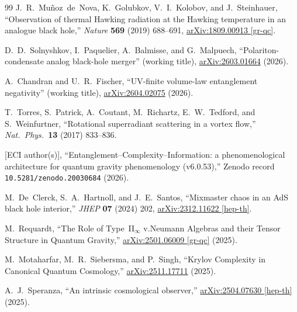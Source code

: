 \documentclass[12pt,a4paper]{article}
\begin{document}
\begin{thebibliography}{99}
J.~R.~Mu\~{n}oz~de~Nova, K.~Golubkov, V.~I.~Kolobov, and J.~Steinhauer,
``Observation of thermal Hawking radiation at the Hawking temperature in
an analogue black hole,''
\textit{Nature} \textbf{569} (2019) 688--691,
\href{https://arxiv.org/abs/1809.00913}{arXiv:1809.00913 [gr-qc]}.

D.~D.~Solnyshkov, I.~Paquelier, A.~Balmisse, and G.~Malpuech,
``Polariton-condensate analog black-hole merger'' (working title),
\href{https://arxiv.org/abs/2603.01664}{arXiv:2603.01664}
(2026).

A.~Chandran and U.~R.~Fischer,
``UV-finite volume-law entanglement negativity'' (working title),
\href{https://arxiv.org/abs/2604.02075}{arXiv:2604.02075}
(2026).

T.~Torres, S.~Patrick, A.~Coutant, M.~Richartz, E.~W.~Tedford, and S.~Weinfurtner,
``Rotational superradiant scattering in a vortex flow,''
\textit{Nat.\ Phys.}\ \textbf{13} (2017) 833--836.

[ECI author(s)],
``Entanglement--Complexity--Information: a phenomenological architecture
for quantum gravity phenomenology (v6.0.53),''
Zenodo record \texttt{10.5281/zenodo.20030684} (2026).

M.~De~Clerck, S.~A.~Hartnoll, and J.~E.~Santos,
``Mixmaster chaos in an AdS black hole interior,''
\textit{JHEP} \textbf{07} (2024) 202,
\href{https://arxiv.org/abs/2312.11622}{arXiv:2312.11622 [hep-th]}.

M.~Requardt,
``The Role of Type~II$_\infty$ v.Neumann Algebras and their Tensor Structure
  in Quantum Gravity,''
\href{https://arxiv.org/abs/2501.06009}{arXiv:2501.06009 [gr-qc]} (2025).

M.~Motaharfar, M.~R.~Siebersma, and P.~Singh,
``Krylov Complexity in Canonical Quantum Cosmology,''
\href{https://arxiv.org/abs/2511.17711}{arXiv:2511.17711} (2025).

A.~J.~Speranza,
``An intrinsic cosmological observer,''
\href{https://arxiv.org/abs/2504.07630}{arXiv:2504.07630 [hep-th]} (2025).

\end{thebibliography}
\end{document}
